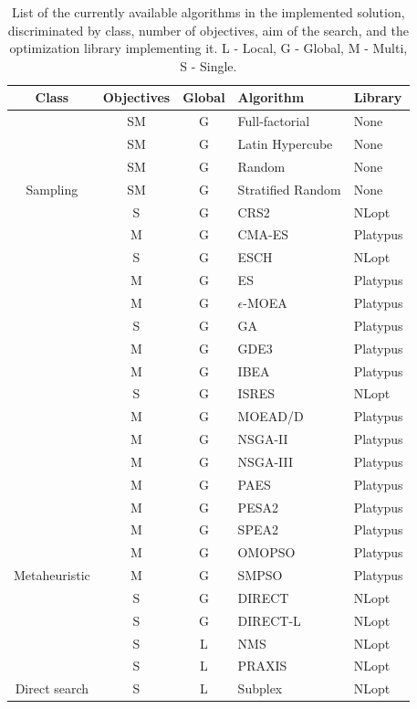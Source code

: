 \begin{table}[]
	\centering
	\caption[List of the algorithms currently supported by the solution]{List of the currently available algorithms in the implemented solution, discriminated by class, number of objectives, aim of the search, and the optimization library implementing it. L - Local, G - Global, M - Multi, S - Single.}
	\label{table:algorithms}
	\begin{tabular}{cccll}
		\rowcolor[HTML]{EFEFEF} 
		\textbf{Class} & \textbf{Objectives} & \textbf{Global} & \textbf{Algorithm} & \textbf{Library} \\ \hline
		& SM & G & Full-factorial & None \\
		& SM & G & Latin Hypercube & None \\
		& SM & G & Random & None \\
		\multirow{-4}{*}{Sampling} & SM & G & Stratified Random & None \\ \hline
		& S & G & CRS2 & NLopt \\
		& M & G & CMA-ES & Platypus \\
		& S & G & ESCH & NLopt \\
		& M & G & ES & Platypus \\
		& M & G & $\epsilon$-MOEA & Platypus \\
		& S & G & GA & Platypus \\
		& M & G & GDE3 & Platypus \\
		& M & G & IBEA & Platypus \\
		& S & G & ISRES & NLopt \\
		& M & G & MOEAD/D & Platypus \\
		& M & G & NSGA-II & Platypus \\
		& M & G & NSGA-III & Platypus \\
		& M & G & PAES & Platypus \\
		& M & G & PESA2 & Platypus \\
		& M & G & SPEA2 & Platypus \\
		& M & G & OMOPSO & Platypus \\
		\multirow{-17}{*}{Metaheuristic} & M & G & SMPSO & Platypus \\ \hline
		& S & G & DIRECT & NLopt \\
		& S & G & DIRECT-L & NLopt \\
		& S & L & NMS & NLopt \\
		& S & L & PRAXIS & NLopt \\
		\multirow{-5}{*}{Direct search} & S & L & Subplex & NLopt \\ \hline

\end{tabular}
\end{table}
